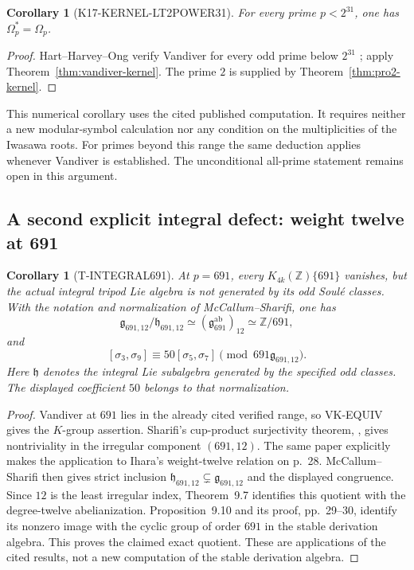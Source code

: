 \documentclass[11pt,a4paper]{article}
\newtheorem{corollary}[theorem]{Corollary}
\theoremstyle{definition}
\begin{document}
\begin{corollary}[K17-KERNEL-LT2POWER31]\label{cor:kernel-lt2power31}
For every prime $p<2^{31}$, one has $\Omega_p^*=\Omega_p$.
\end{corollary}

\begin{proof}
Hart--Harvey--Ong verify Vandiver for every odd prime below $2^{31}$
\cite[\S1, item~(2), p.~1]{HartHarveyOng2017}; apply
Theorem~\ref{thm:vandiver-kernel}. The prime $2$ is supplied by
Theorem~\ref{thm:pro2-kernel}.
\end{proof}

This numerical corollary uses the cited published computation. It
requires neither a new modular-symbol calculation nor any condition
on the multiplicities of the Iwasawa roots. For primes beyond this
range the same deduction applies whenever Vandiver is established.
The unconditional all-prime statement remains open in this argument.

\subsection{A second explicit integral defect: weight twelve at 691}

\begin{corollary}[T-INTEGRAL691]
At $p=691$, every $K_{4k}(\mathbb Z)\{691\}$ vanishes, but the
actual integral tripod Lie algebra is not generated by its odd
Soul\'e classes. With the notation and normalization of
McCallum--Sharifi, one has
\[
 \mathfrak g_{691,12}/\mathfrak h_{691,12}
 \simeq (\mathfrak g_{691}^{\mathrm{ab}})_{12}
 \simeq\mathbb Z/691,
\]
and
\[
 [\sigma_3,\sigma_9]\equiv50[\sigma_5,\sigma_7]
       \pmod{691\mathfrak g_{691,12}}.
\]
Here $\mathfrak h$ denotes the integral Lie subalgebra generated by
the specified odd classes. The displayed coefficient $50$ belongs
to that normalization.
\end{corollary}

\begin{proof}
Vandiver at $691$ lies in the already cited verified range, so
VK-EQUIV gives the $K$-group assertion. Sharifi's cup-product
surjectivity theorem, \cite[Theorem~1.2, p.~2; Corollary~5.9,
p.~27]{Sharifi2007}, gives nontriviality in the irregular component
$(691,12)$. The same paper explicitly makes the application to
Ihara's weight-twelve relation on p.~28.
McCallum--Sharifi \cite[Theorem~9.11, p.~30]{McCallumSharifi2003}
then gives strict inclusion $\mathfrak h_{691,12}\subsetneq
\mathfrak g_{691,12}$ and the displayed congruence. Since $12$ is
the least irregular index, Theorem~9.7 identifies this quotient
with the degree-twelve abelianization. Proposition~9.10 and its
proof, pp.~29--30, identify its nonzero image with the cyclic
group of order $691$ in the stable derivation algebra. This proves
the claimed exact quotient. These are applications of the cited
results, not a new computation of the stable derivation algebra.
\end{proof}
\end{document}
